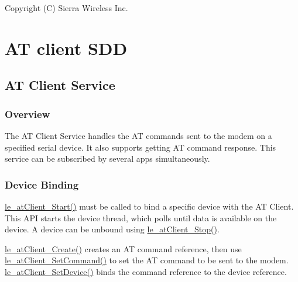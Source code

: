 Copyright (C) Sierra Wireless Inc. \hypertarget{c_SDD_atClient}{}\section{AT client S\+DD}\label{c_SDD_atClient}
\hypertarget{c_SDD_atClient_atClient_service}{}\subsection{A\+T Client Service}\label{c_SDD_atClient_atClient_service}
\hypertarget{c_SDD_mdc_Overview}{}\subsubsection{Overview}\label{c_SDD_mdc_Overview}
The AT Client Service handles the AT commands sent to the modem on a specified serial device. It also supports getting AT command response. This service can be subscribed by several apps simultaneously.\hypertarget{c_SDD_atClient_atClient_binding}{}\subsubsection{Device Binding}\label{c_SDD_atClient_atClient_binding}
\hyperlink{le__at_client__interface_8h_a58f48ecb3c1569a4b68be4006a751f36}{le\+\_\+at\+Client\+\_\+\+Start()} must be called to bind a specific device with the AT Client. This A\+PI starts the device thread, which polls until data is available on the device. A device can be unbound using \hyperlink{le__at_client__interface_8h_a1cf248c81134ae44639ab62e3c501cf1}{le\+\_\+at\+Client\+\_\+\+Stop()}.

\hyperlink{le__at_client__interface_8h_aead1c543cd8e65d1ad531233af2c7529}{le\+\_\+at\+Client\+\_\+\+Create()} creates an AT command reference, then use \hyperlink{le__at_client__interface_8h_a156e43a17cd85dee38fb7ae4182e8864}{le\+\_\+at\+Client\+\_\+\+Set\+Command()} to set the AT command to be sent to the modem. \hyperlink{le__at_client__interface_8h_a44588125903f97d422ea14c5fd534683}{le\+\_\+at\+Client\+\_\+\+Set\+Device()} binds the command reference to the device reference.

